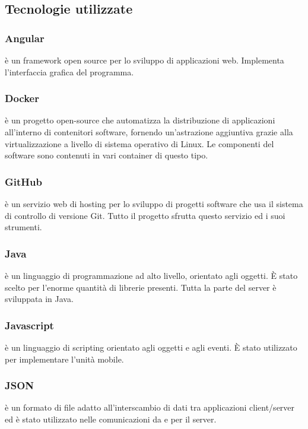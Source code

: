 \subsection{Tecnologie utilizzate}

	\subsubsection{Angular}
	 è un framework open source per lo sviluppo di applicazioni web. Implementa l'interfaccia grafica del programma.
	
	\subsubsection{Docker}
	 è un progetto open-source che automatizza la distribuzione di applicazioni all’interno di contenitori software, fornendo un’astrazione aggiuntiva grazie alla virtualizzazione a livello di sistema operativo di Linux. Le componenti del software sono contenuti in vari container di questo tipo.
	
	\subsubsection{GitHub}
	 è un servizio web di hosting per lo sviluppo di progetti software che usa il sistema di controllo di versione Git. Tutto il progetto sfrutta questo servizio ed i suoi strumenti.
	
	\subsubsection{Java}
	 è un linguaggio di programmazione ad alto livello, orientato agli oggetti. È stato scelto per l'enorme quantità di librerie presenti. Tutta la parte del server è sviluppata in Java.
	
	\subsubsection{Javascript}
	 è un linguaggio di scripting orientato agli oggetti e agli eventi. È stato utilizzato per implementare l'unità mobile.
	
	\subsubsection{JSON}
	 è un formato di file adatto all'interscambio di dati tra applicazioni client/server ed è stato utilizzato nelle comunicazioni da e per il server.
	
